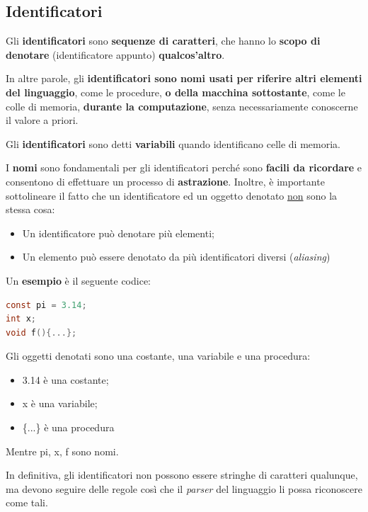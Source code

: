 \documentclass[a4paper]{article}
\begin{document}
	\subsection{Identificatori}
	
	Gli \textbf{identificatori} sono \textbf{sequenze di caratteri}, che hanno lo \textbf{scopo di denotare} (identificatore appunto) \textbf{qualcos'altro}.\newline
	
	\noindent
	In altre parole, gli \textbf{identificatori sono nomi usati per riferire altri elementi del linguaggio}, come le procedure, \textbf{o della macchina sottostante}, come le colle di memoria, \textbf{durante la computazione}, senza necessariamente conoscerne il valore a priori.\newline
	
	\noindent
	Gli \textbf{identificatori} sono detti \textbf{variabili} quando identificano celle di memoria.\newline
	
	\noindent
	I \textbf{nomi} sono fondamentali per gli identificatori perché sono \textbf{facili da ricordare} e consentono di effettuare un processo di \textbf{astrazione}. Inoltre, è importante sottolineare il fatto che un identificatore ed un oggetto denotato \underline{non} sono la stessa cosa:
	\begin{itemize}
		\item Un identificatore può denotare più elementi;
		\item Un elemento può essere denotato da più identificatori diversi (\emph{aliasing})
	\end{itemize}
	Un \textcolor{Green4}{\textbf{esempio}} è il seguente codice:
	\begin{lstlisting}[language=C]
const pi = 3.14;
int x;
void f(){...};\end{lstlisting}
	Gli oggetti denotati sono una costante, una variabile e una procedura:
	\begin{itemize}
		\item \textsf{3.14} è una costante;
		\item \textsf{x} è una variabile;
		\item \textsf{\{...\}} è una procedura
	\end{itemize}
	Mentre \textsf{pi, x, f} sono nomi.\newline
	
	\noindent
	In definitiva, gli identificatori non possono essere stringhe di caratteri qualunque, ma devono seguire delle regole così che il \emph{parser} del linguaggio li possa riconoscere come tali.\newline
	
\end{document}

